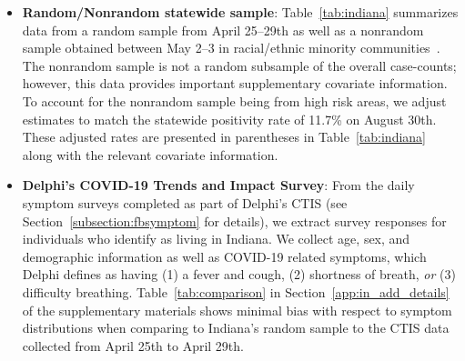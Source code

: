 \documentclass[11pt]{amsart}
\numberwithin{equation}{section}
\theoremstyle{plain}
\begin{document}
\begin{itemize}[leftmargin=*]
 \item {\bf Random/Nonrandom statewide sample}: Table~\ref{tab:indiana} summarizes data from a random sample from April 25--29th as well as a nonrandom sample obtained between May 2--3 in racial/ethnic minority communities~\citep{Yiannoutsos2021}. The nonrandom sample is not a random subsample of the overall case-counts; however, this data provides important supplementary covariate information.
 To account for the nonrandom sample being from high risk areas, we adjust estimates to match the statewide positivity rate of 11.7\% on August 30th. These adjusted rates are presented in parentheses in Table~\ref{tab:indiana} along with the relevant covariate information.

 \item {\bf Delphi's COVID-19 Trends and Impact Survey}: From the daily symptom surveys completed as part of Delphi's CTIS (see Section~\ref{subsection:fbsymptom} for details), we extract survey responses for individuals who identify as living in Indiana.  We collect age, sex, and demographic information as well as COVID-19 related symptoms, which Delphi defines as having (1) a fever and cough, (2) shortness of breath, \emph{or} (3) difficulty breathing. Table~\ref{tab:comparison} in Section~\ref{app:in_add_details} of the supplementary materials shows minimal bias with respect to symptom distributions when comparing to Indiana's random sample to the CTIS data collected from April 25th to April 29th.




\end{itemize}
\end{document}
